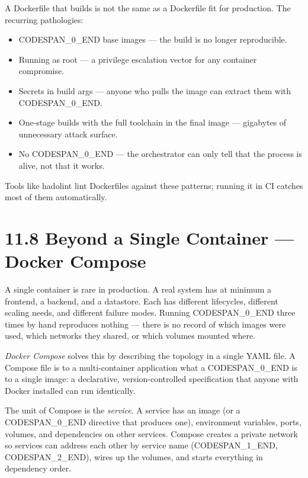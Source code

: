 \documentclass[11pt,a4paper]{book}
\begin{document}
A Dockerfile that builds is not the same as a Dockerfile fit for production. The recurring pathologies:

\begin{itemize}
  \item CODESPAN\_0\_END base images --- the build is no longer reproducible.
  \item Running as root --- a privilege escalation vector for any container compromise.
  \item Secrets in build args --- anyone who pulls the image can extract them with CODESPAN\_0\_END.
  \item One-stage builds with the full toolchain in the final image --- gigabytes of unnecessary attack surface.
  \item No CODESPAN\_0\_END --- the orchestrator can only tell that the process is alive, not that it works.
\end{itemize}

Tools like hadolint lint Dockerfiles against these patterns; running it in CI catches most of them automatically.

\medskip

\section{11.8 Beyond a Single Container --- Docker Compose}

A single container is rare in production. A real system has at minimum a frontend, a backend, and a datastore. Each has different lifecycles, different scaling needs, and different failure modes. Running CODESPAN\_0\_END three times by hand reproduces nothing --- there is no record of which images were used, which networks they shared, or which volumes mounted where.

\textit{Docker Compose} solves this by describing the topology in a single YAML file. A Compose file is to a multi-container application what a CODESPAN\_0\_END is to a single image: a declarative, version-controlled specification that anyone with Docker installed can run identically.

The unit of Compose is the \textit{service}. A service has an image (or a CODESPAN\_0\_END directive that produces one), environment variables, ports, volumes, and dependencies on other services. Compose creates a private network so services can address each other by service name (CODESPAN\_1\_END, CODESPAN\_2\_END), wires up the volumes, and starts everything in dependency order.
\end{document}
